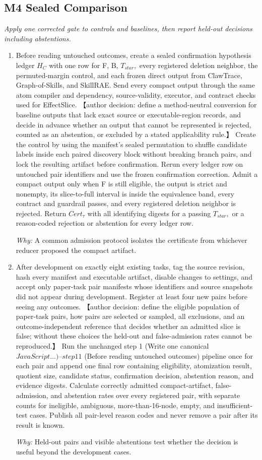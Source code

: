 \documentclass[10pt,a4paper]{article}
\begin{document}
\subsection*{M4 Sealed Comparison}
\emph{Apply one corrected gate to controls and baselines, then report held-out decisions including abstentions.}
\begin{enumerate}[leftmargin=*,start=11]
  \item Before reading untouched outcomes, create a sealed confirmation hypothesis ledger \(H_{C}\) with one row for F, B, \(T_{star},\) every registered deletion neighbor, the permuted-margin control, and each frozen direct output from ClawTrace, Graph-of-Skills, and SkillRAE. Send every compact output through the same atom compiler and dependency, source-validity, executor, and contract checks used for EffectSlice. 【author decision: define a method-neutral conversion for baseline outputs that lack exact source or executable-region records, and decide in advance whether an output that cannot be represented is rejected, counted as an abstention, or excluded by a stated applicability rule.】 Create the control by using the manifest's sealed permutation to shuffle candidate labels inside each paired discovery block without breaking branch pairs, and lock the resulting artifact before confirmation. Rerun every ledger row on untouched pair identifiers and use the frozen confirmation correction. Admit a compact output only when F is still eligible, the output is strict and nonempty, its slice-to-full interval is inside the equivalence band, every contract and guardrail passes, and every registered deletion neighbor is rejected. Return \(Cert_\tau \) with all identifying digests for a passing \(T_{star},\) or a reason-coded rejection or abstention for every ledger row.
\par\emph{Why:} A common admission protocol isolates the certificate from whichever reducer proposed the compact artifact.
  \item After development on exactly eight existing tasks, tag the source revision, hash every manifest and executable artifact, disable changes to settings, and accept only paper-task pair manifests whose identifiers and source snapshots did not appear during development. Register at least four new pairs before seeing any outcomes. 【author decision: define the eligible population of paper-task pairs, how pairs are selected or sampled, all exclusions, and an outcome-independent reference that decides whether an admitted slice is false;\allowbreak{} without these choices the held-out and false-admission rates cannot be reproduced.】 Run the unchanged step 1 (Write one canonical \(JavaScript\dots )–step 11\) (Before reading untouched outcomes) pipeline once for each pair and append one final row containing eligibility, atomization result, quotient size, candidate status, confirmation decision, abstention reason, and evidence digests. Calculate correctly admitted compact-artifact, false-admission, and abstention rates over every registered pair, with separate counts for ineligible, ambiguous, more-than-16-node, empty, and insufficient-test cases. Publish all pair-level reason codes and never remove a pair after its result is known.
\par\emph{Why:} Held-out pairs and visible abstentions test whether the decision is useful beyond the development cases.
\end{enumerate}
\end{document}
